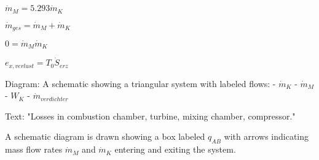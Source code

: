 \( \dot{m}_M = 5.293 \dot{m}_K \)

\( \dot{m}_{ges} = \dot{m}_M + \dot{m}_K \)

\( 0 = \dot{m}_M \dot{m}_K \)

\( e_{x,verlust} = T_0 \dot{S}_{erz} \)

Diagram: A schematic showing a triangular system with labeled flows:  
- \( \dot{m}_K \)  
- \( \dot{m}_M \)  
- \( W_K \)  
- \( \dot{m}_{verdichter} \)

Text:  
"Losses in combustion chamber, turbine, mixing chamber, compressor."

A schematic diagram is drawn showing a box labeled \( q_{AB} \) with arrows indicating mass flow rates \( \dot{m}_M \) and \( \dot{m}_K \) entering and exiting the system.